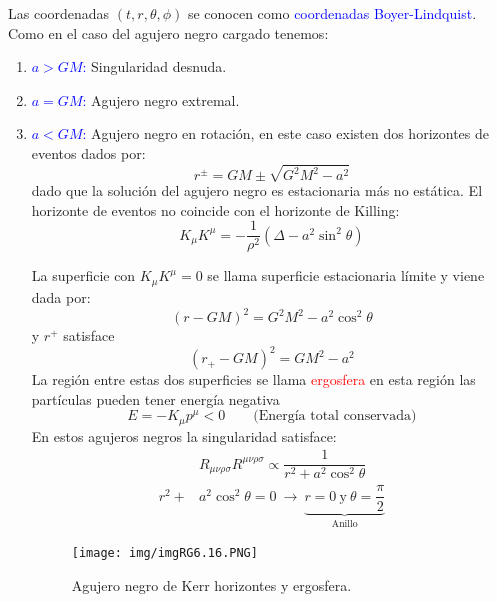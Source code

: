 \documentclass[../main]{subfiles}
\begin{document}
Las coordenadas $(t, r, \theta, \phi)$ se conocen como \textcolor{blue}{coordenadas Boyer-Lindquist}. Como en el caso del agujero negro cargado tenemos:
\begin{enumerate}
    \item \textcolor{blue}{$a> GM$:} Singularidad desnuda.
    \item \textcolor{blue}{$a = GM$:} Agujero negro extremal.
    \item \textcolor{blue}{$a < GM$:} Agujero negro en rotación, en este caso existen dos horizontes de eventos dados por:
    \begin{equation}
        r^{\pm}=GM\pm \sqrt{G^2M^2-a^2}
    \end{equation}
    dado que la solución del agujero negro es estacionaria más no estática. El horizonte de eventos no coincide con el horizonte de Killing:
    \begin{equation}
        K_{\mu}K^{\mu}=-\dfrac{1}{\rho^2}(\Delta-a^2\sin^2 \theta)
    \end{equation}

    La superficie con $K_{\mu}K^{\mu}=0$ se llama superficie estacionaria límite y viene dada por:
    \begin{equation}
        (r-GM)^2=G^2M^2-a^2\cos^2 \theta
    \end{equation}
    y $r^+$ satisface 
    \begin{equation}
        (r_+-GM)^2=GM^2-a^2
    \end{equation}
    La región entre estas dos superficies se llama \textcolor{red}{ergosfera} en esta región las partículas pueden tener energía negativa
    \begin{equation}
        E=-K_{\mu}p^{\mu}<0 \qquad \text{(Energía total conservada)}
    \end{equation}
    En estos agujeros negros la singularidad satisface:
    \begin{equation}
        \begin{split}
            &R_{\mu\nu\rho\sigma} R^{\mu\nu\rho\sigma} \propto \dfrac{1}{r^2+a^2 \cos^2 \theta}\\
            r^2+&a^2\cos^2 \theta=0 \ \rightarrow \ \underbrace{r=0 \ \text{y} \ \theta=\dfrac{\pi}{2}}_{\text{Anillo}}
        \end{split}
    \end{equation}
    \begin{figure}[h]
        \centering
        \texttt{[image: img/imgRG6.16.PNG]}
        \caption{Agujero negro de Kerr horizontes y ergosfera.}
    \end{figure}
\end{enumerate}
\end{document}
